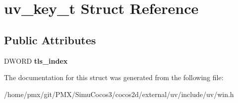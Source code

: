 \hypertarget{structuv__key__t}{}\section{uv\+\_\+key\+\_\+t Struct Reference}
\label{structuv__key__t}
\subsection*{Public Attributes}
\begin{DoxyCompactItemize}
\item 
\mbox{\label{structuv__key__t_a1381f37dcf44ecdd07602ab4d9e96e9b}} 
D\+W\+O\+RD {\bfseries tls\+\_\+index}
\end{DoxyCompactItemize}


The documentation for this struct was generated from the following file\+:\begin{DoxyCompactItemize}
\item 
/home/pmx/git/\+P\+M\+X/\+Simu\+Cocos3/cocos2d/external/uv/include/uv/win.\+h\end{DoxyCompactItemize}
